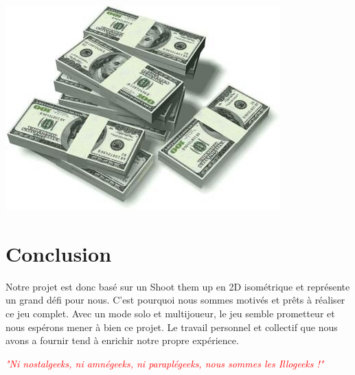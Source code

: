 \documentclass{article}
\begin{document}
\begin{center}
\includegraphics[scale=0.5]{Dollars}
\end{center}



\newpage
\section{Conclusion}

\par
Notre projet est donc basé sur un Shoot them up en 2D isométrique et représente un grand défi pour nous. C'est pourquoi nous sommes motivés et prêts à réaliser ce jeu complet. Avec un mode solo et multijoueur, le jeu semble prometteur et nous espérons mener à bien ce projet. Le travail personnel et collectif que nous avons a fournir tend à enrichir notre propre expérience. 

\vspace*{6cm}

\par
\begin{center}
\textcolor{red}{\emph{"Ni nostalgeeks, ni amnégeeks, ni paraplégeeks, nous sommes les Illogeeks !"}}
\end{center}
\end{document}

